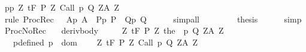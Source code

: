 \begin{isabellebody}
\ {\isachardoublequoteopen}{\isasymforall}p{\isasymin}{\isacharbraceleft}p{\isacharbraceright}{\isachardot}\ {\isasymforall}Z{\isachardot}\ {\isasymGamma}{\isacharcomma}{\isasymTheta}{\isasymturnstile}\isactrlsub t\isactrlbsub {\isacharslash}F\isactrlesub \ {\isacharparenleft}P\ Z{\isacharparenright}\ Call\ p\ {\isacharparenleft}Q\ Z{\isacharparenright}{\isacharcomma}{\isacharparenleft}A\ Z{\isacharparenright}{\isachardoublequoteclose}\isanewline
\ \ \ \ \isamarkupfalse%
\ {\isacharminus}\ \isanewline
\ \ \ \ \isamarkupfalse%
\ {\isacharparenleft}rule\ ProcRec\ {\isacharbrackleft}\ \ A{\isacharequal}{\isachardoublequoteopen}{\isasymlambda}p{\isachardot}\ A{\isachardoublequoteclose}\ \ P{\isacharequal}{\isachardoublequoteopen}{\isasymlambda}p{\isachardot}\ P{\isachardoublequoteclose}\ \ Q{\isacharequal}{\isachardoublequoteopen}{\isasymlambda}p{\isachardot}\ Q{\isachardoublequoteclose}{\isacharbrackright}{\isacharparenright}\isanewline
\ \ \ \ \isamarkupfalse%
\ simp{\isacharunderscore}all\isanewline
\ \ \ \ \isamarkupfalse%
\isanewline
\ \ \isamarkupfalse%
\ {\isacharquery}thesis\isanewline
\ \ \ \ \isamarkupfalse%
\ simp\isanewline
{}\isamarkupfalse%
%
\endisatagproof
{\isafoldproof}%
%
\isadelimproof
\isanewline
%
\endisadelimproof
\isanewline
{}\isamarkupfalse%
\ ProcNoRec{}{\isacharcolon}\isanewline
\ \ \ deriv{\isacharunderscore}body{\isacharcolon}\ \ \isanewline
\ \ \ {\isachardoublequoteopen}{\isasymforall}Z{\isachardot}\ {\isasymGamma}{\isacharcomma}{\isasymTheta}{\isasymturnstile}\isactrlsub t\isactrlbsub {\isacharslash}F\isactrlesub \ {\isacharparenleft}P\ Z{\isacharparenright}\ {\isacharparenleft}the\ {\isacharparenleft}{\isasymGamma}\ p{\isacharparenright}{\isacharparenright}\ {\isacharparenleft}Q\ Z{\isacharparenright}{\isacharcomma}{\isacharparenleft}A\ Z{\isacharparenright}{\isachardoublequoteclose}\isanewline
\ \ \ p{\isacharunderscore}defined{\isacharcolon}\ {\isachardoublequoteopen}p\ {\isasymin}\ dom\ {\isasymGamma}{\isachardoublequoteclose}\isanewline
\ \ \ {\isachardoublequoteopen}{\isasymforall}Z{\isachardot}\ {\isasymGamma}{\isacharcomma}{\isasymTheta}{\isasymturnstile}\isactrlsub t\isactrlbsub {\isacharslash}F\isactrlesub \ {\isacharparenleft}P\ Z{\isacharparenright}\ Call\ p\ {\isacharparenleft}Q\ Z{\isacharparenright}{\isacharcomma}{\isacharparenleft}A\ Z{\isacharparenright}{\isachardoublequoteclose}\isanewline

\end{isabellebody}
